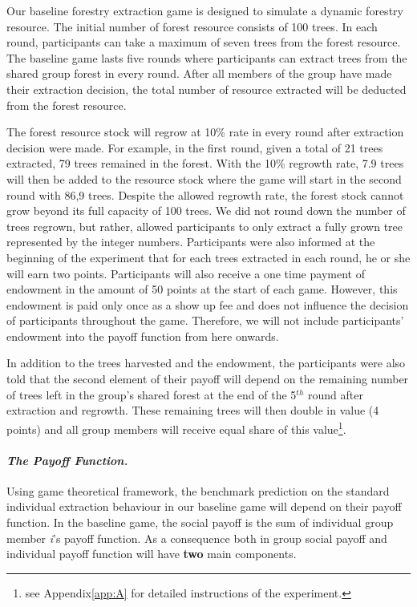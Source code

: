 Our baseline forestry extraction game is designed to simulate a dynamic forestry resource. The initial number of forest resource consists of 100 trees. In each round, participants can take a maximum of seven trees from the forest resource. The baseline game lasts five rounds where participants can extract trees from the shared group forest in every round. After all members of the group have made their extraction decision, the total number of resource extracted will be deducted from the forest resource.

 The forest resource stock will regrow at 10\% rate in every round after extraction decision were made. For example, in the first round, given a total of 21 trees extracted, 79 trees remained in the forest. With the 10\% regrowth rate, 7.9 trees will then be added to the resource stock where the game will start in the second round with 86,9 trees. Despite the allowed regrowth rate, the forest stock cannot grow beyond its full capacity of 100 trees. We did not round down the number of trees regrown, but rather, allowed participants to only extract a fully grown tree represented by the integer numbers. Participants were also informed at the beginning of the experiment that for each trees extracted in each round, he or she will earn two points. Participants will also receive a one time payment of endowment in the amount of 50 points at the start of each game. However, this endowment is paid only once as a show up fee and does not influence the decision of participants throughout the game. Therefore, we will not include participants' endowment into the payoff function from here onwards.

 In addition to the trees harvested and the endowment, the participants were also told that the second element of their payoff will depend on the remaining number of trees left in the group's shared forest at the end of the 5$^{th}$ round after extraction and regrowth. These remaining trees will then double in value (4 points) and all group members will receive equal share of this value\footnote{see Appendix\ref{app:A} for detailed instructions of the experiment.}.


\paragraph{\textit{The Payoff Function.}}

Using game theoretical framework, the benchmark prediction on the standard individual extraction behaviour in our baseline game will depend on their payoff function. In the baseline game, the social payoff is the sum of individual group member \textit{i}'s payoff function. As a consequence both in group social payoff and individual payoff function will have \textbf{two} main components.


